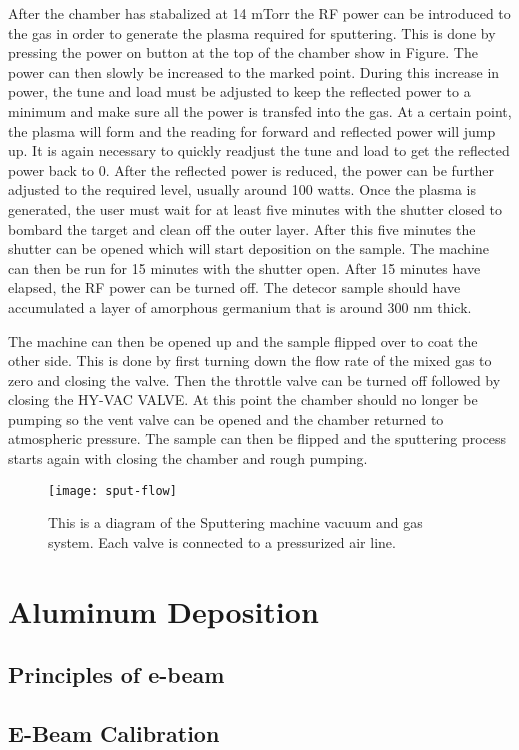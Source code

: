 After the chamber has stabalized at 14 mTorr the RF power can be introduced to the gas in order to generate the plasma required for sputtering.
This is done by pressing the power on button at the top of the chamber show in Figure.
The power can then slowly be increased to the marked point.
During this increase in power, the tune and load must be adjusted to keep the reflected power to a minimum and make sure all the power is transfed into the gas.
At a certain point, the plasma will form and the reading for forward and reflected power will jump up.
It is again necessary to quickly readjust the tune and load to get the reflected power back to 0.
After the reflected power is reduced, the power can be further adjusted to the required level, usually around 100 watts.
Once the plasma is generated, the user must wait for at least five minutes with the shutter closed to bombard the target and clean off the outer layer.
After this five minutes the shutter can be opened which will start deposition on the sample.
The machine can then be run for 15 minutes with the shutter open.
After 15 minutes have elapsed, the RF power can be turned off.
The detecor sample should have accumulated a layer of amorphous germanium that is around 300 nm thick.

The machine can then be opened up and the sample flipped over to coat the other side.
This is done by first turning down the flow rate of the mixed gas to zero and closing the valve.
Then the throttle valve can be turned off followed by closing the HY-VAC VALVE.
At this point the chamber should no longer be pumping so the vent valve can be opened and the chamber returned to atmospheric pressure.
The sample can then be flipped and the sputtering process starts again with closing the chamber and rough pumping.
\begin{sidewaysfigure}
\texttt{[image: sput-flow]}
\caption{This is a diagram of the Sputtering machine vacuum and gas system. Each valve is connected to a pressurized air line.}
\label{fig:sput-flow}
\end{sidewaysfigure}%
\section{Aluminum Deposition}
\subsection{Principles of e-beam}
\subsection{E-Beam Calibration}

